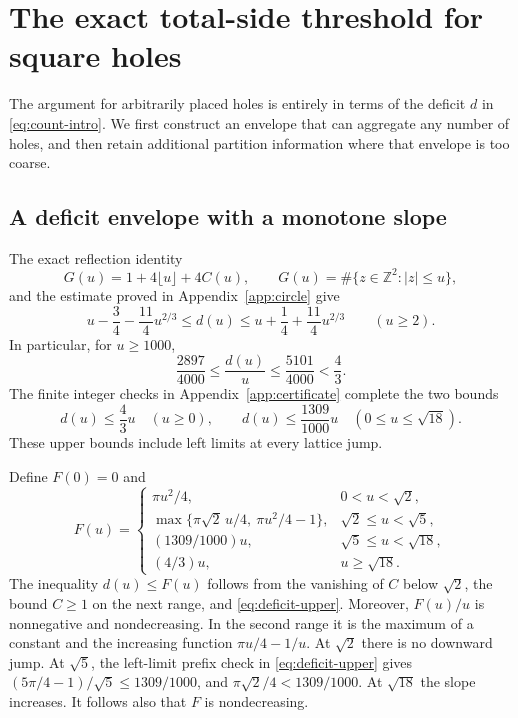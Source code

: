 \documentclass[11pt,reqno]{amsart}
\numberwithin{equation}{section}
\newcommand{\Z}{\mathbb Z}
\newcommand{\abs}[1]{\lvert#1\rvert}
\begin{document}
\section{The exact total-side threshold for square holes}\label{sec:holes}

The argument for arbitrarily placed holes is entirely in terms
of the deficit $d$ in \eqref{eq:count-intro}. We first construct
an envelope that can aggregate any number of holes, and then
retain additional partition information where that envelope is
too coarse.

\subsection*{A deficit envelope with a monotone slope}

The exact reflection identity
\begin{equation}\label{eq:reflection}
 G(u)=1+4\lfloor u\rfloor+4C(u),\qquad
 G(u)=\#\{z\in\Z^2:\abs z\le u\},
\end{equation}
and the estimate proved in Appendix~\ref{app:circle} give
\begin{equation}\label{eq:deficit-tail}
 u-\frac34-\frac{11}{4}u^{2/3}\le d(u)
 \le u+\frac14+\frac{11}{4}u^{2/3}\qquad(u\ge2).
\end{equation}
In particular, for $u\ge1000$,
\begin{equation}\label{eq:thousand}
 \frac{2897}{4000}\le\frac{d(u)}u
 \le\frac{5101}{4000}<\frac43.
\end{equation}
The finite integer checks in Appendix~\ref{app:certificate}
complete the two bounds
\begin{equation}\label{eq:deficit-upper}
 d(u)\le\frac43u\quad(u\ge0),\qquad
 d(u)\le\frac{1309}{1000}u\quad(0\le u\le\sqrt{18}).
\end{equation}
These upper bounds include left limits at every lattice jump.

Define $F(0)=0$ and
\begin{equation}\label{eq:envelope}
 F(u)=
 \begin{cases}
 \pi u^2/4,&0<u<\sqrt2,\\
 \max\{\pi\sqrt2\,u/4,\ \pi u^2/4-1\},
        &\sqrt2\le u<\sqrt5,\\
 (1309/1000)u,&\sqrt5\le u<\sqrt{18},\\
 (4/3)u,&u\ge\sqrt{18}.
 \end{cases}
\end{equation}
The inequality $d(u)\le F(u)$ follows from the vanishing of $C$
below $\sqrt2$, the bound $C\ge1$ on the next range, and
\eqref{eq:deficit-upper}. Moreover, $F(u)/u$ is nonnegative
and nondecreasing. In the second range it is the maximum of a
constant and the increasing function $\pi u/4-1/u$.
At $\sqrt2$ there is no downward jump. At $\sqrt5$, the
left-limit prefix check in \eqref{eq:deficit-upper} gives
$(5\pi/4-1)/\sqrt5\le1309/1000$, and
$\pi\sqrt2/4<1309/1000$. At $\sqrt{18}$ the slope increases.
It follows also that $F$ is nondecreasing.
\end{document}
